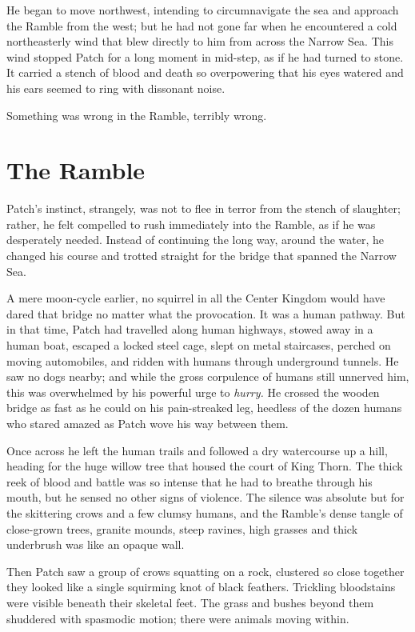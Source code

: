 \documentclass[12pt]{memoir}
\begin{document}
He began to move northwest, intending to circumnavigate the sea and
approach the Ramble from the west; but he had not gone far when he
encountered a cold northeasterly wind that blew directly to him from
across the Narrow Sea. This wind stopped Patch for a long moment in
mid-step, as if he had turned to stone. It carried a stench of blood
and death so overpowering that his eyes watered and his ears seemed to
ring with dissonant noise.

Something was wrong in the Ramble, terribly wrong.


\section{The Ramble}

Patch’s instinct, strangely, was not to flee in terror from the stench
of slaughter; rather, he felt compelled to rush immediately into the
Ramble, as if he was desperately needed. Instead of continuing the
long way, around the water, he changed his course and trotted straight
for the bridge that spanned the Narrow Sea.

A mere moon-cycle earlier, no squirrel in all the Center Kingdom would
have dared that bridge no matter what the provocation. It was a human
pathway. But in that time, Patch had travelled along human highways,
stowed away in a human boat, escaped a locked steel cage, slept on
metal staircases, perched on moving automobiles, and ridden with
humans through underground tunnels. He saw no dogs nearby; and while
the gross corpulence of humans still unnerved him, this was
overwhelmed by his powerful urge to \textit{hurry.} He crossed the
wooden bridge as fast as he could on his pain-streaked leg, heedless
of the dozen humans who stared amazed as Patch wove his way between
them.

Once across he left the human trails and followed a dry watercourse up
a hill, heading for the huge willow tree that housed the court of King
Thorn. The thick reek of blood and battle was so intense that he had
to breathe through his mouth, but he sensed no other signs of
violence. The silence was absolute but for the skittering crows and a
few clumsy humans, and the Ramble’s dense tangle of close-grown trees,
granite mounds, steep ravines, high grasses and thick underbrush was
like an opaque wall.

Then Patch saw a group of crows squatting on a rock, clustered so
close together they looked like a single squirming knot of black
feathers. Trickling bloodstains were visible beneath their skeletal
feet. The grass and bushes beyond them shuddered with spasmodic
motion; there were animals moving within.
\end{document}
